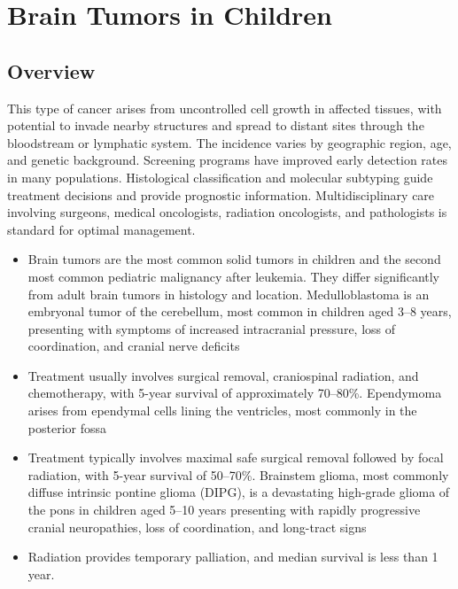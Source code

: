 \chapter{Brain Tumors in Children}
\label{sec:Brain Tumors in Children}

\section{Overview}
This type of cancer arises from uncontrolled cell growth in affected tissues, with potential to invade nearby structures and spread to distant sites through the bloodstream or lymphatic system. The incidence varies by geographic region, age, and genetic background. Screening programs have improved early detection rates in many populations. Histological classification and molecular subtyping guide treatment decisions and provide prognostic information. Multidisciplinary care involving surgeons, medical oncologists, radiation oncologists, and pathologists is standard for optimal management.

\begin{itemize}[noitemsep]
  \item Brain tumors are the most common solid tumors in children and the second most common pediatric malignancy after leukemia. They differ significantly from adult brain tumors in histology and location. Medulloblastoma is an embryonal tumor of the cerebellum, most common in children aged 3--8 years, presenting with symptoms of increased intracranial pressure, loss of coordination, and cranial nerve deficits
  \item Treatment usually involves surgical removal, craniospinal radiation, and chemotherapy, with 5-year survival of approximately 70--80\%. Ependymoma arises from ependymal cells lining the ventricles, most commonly in the posterior fossa
  \item Treatment typically involves maximal safe surgical removal followed by focal radiation, with 5-year survival of 50--70\%. Brainstem glioma, most commonly diffuse intrinsic pontine glioma (DIPG), is a devastating high-grade glioma of the pons in children aged 5--10 years presenting with rapidly progressive cranial neuropathies, loss of coordination, and long-tract signs
  \item Radiation provides temporary palliation, and median survival is less than 1 year.
\end{itemize}
